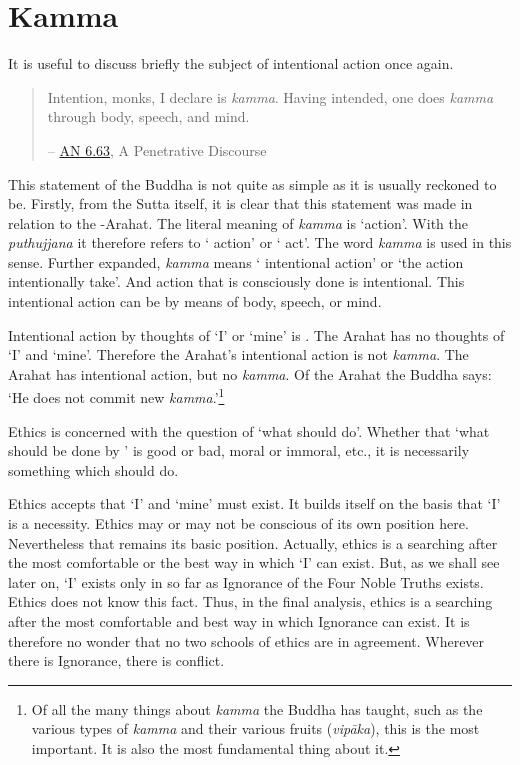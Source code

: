 \chapter{Kamma}

It is useful to discuss briefly the subject of intentional action once again.

\begin{quote}
Intention, monks, I declare is \emph{kamma}. Having intended, one does \emph{kamma} through body, speech, and mind.

 -- \href{https://suttacentral.net/an6.63/en/thanissaro}{AN 6.63}, A Penetrative Discourse
\end{quote}

This statement of the Buddha is not quite as simple as it is usually reckoned to be. Firstly, from the Sutta itself, it is clear that this statement was made in relation to the -Arahat. The literal meaning of \emph{kamma} is `action'. With the \emph{puthujjana} it therefore refers to ` action' or ` act'. The word \emph{kamma} is used in this sense. Further expanded, \emph{kamma} means ` intentional action' or `the action  intentionally take'. And  action that is consciously done is intentional. This intentional action can be by means of body, speech, or mind.

Intentional action  by thoughts of `I' or `mine' is . The Arahat has no thoughts of `I' and `mine'. Therefore the Arahat's intentional action is not \emph{kamma}. The Arahat has intentional action, but no \emph{kamma}.  Of the Arahat the Buddha says: `He does not commit new \emph{kamma}.'\footnote{Of all the many things about \emph{kamma} the Buddha has taught, such as the various types of \emph{kamma} and their various fruits (\emph{vipāka}), this is the most important. It is also the most fundamental thing about it.}

Ethics is concerned with the question of `what should  do'. Whether that `what should be done by ' is good or bad, moral or immoral, etc., it is necessarily something which  should do.

Ethics accepts that `I' and `mine' must exist. It builds itself on the basis that `I' is a necessity. Ethics may or may not be conscious of its own position here. Nevertheless that remains its basic position. Actually, ethics is a searching after the most comfortable or the best way in which `I' can exist. But, as we shall see later on, `I' exists only in so far as Ignorance of the Four Noble Truths exists. Ethics does not know this fact. Thus, in the final analysis, ethics is a searching after the most comfortable and best way in which Ignorance can exist. It is therefore no wonder that no two schools of ethics are in agreement. Wherever there is Ignorance, there is conflict.

